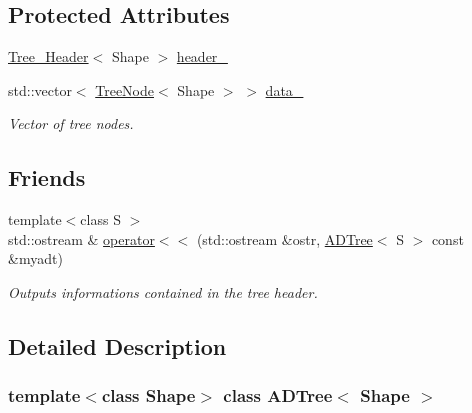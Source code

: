 \subsection*{Protected Attributes}
\begin{DoxyCompactItemize}
\item 
\hyperlink{classTree__Header}{Tree\_\-Header}$<$ Shape $>$ \hyperlink{classADTree_ab5ed42c46d811ca39c9a6966b974a04b}{header\_\-}
\item 
\hypertarget{classADTree_a8d9d14d549f0d88231fa7a4978186b44}{
std::vector$<$ \hyperlink{classTreeNode}{TreeNode}$<$ Shape $>$ $>$ \hyperlink{classADTree_a8d9d14d549f0d88231fa7a4978186b44}{data\_\-}}
\label{classADTree_a8d9d14d549f0d88231fa7a4978186b44}

\begin{DoxyCompactList}\small\item\em Vector of tree nodes. \item\end{DoxyCompactList}\end{DoxyCompactItemize}
\subsection*{Friends}
\begin{DoxyCompactItemize}
\item 
\hypertarget{classADTree_a0386e0202ce113c45fc291d6438ce0de}{
{\footnotesize template$<$class S $>$ }\\std::ostream \& \hyperlink{classADTree_a0386e0202ce113c45fc291d6438ce0de}{operator$<$$<$} (std::ostream \&ostr, \hyperlink{classADTree}{ADTree}$<$ S $>$ const \&myadt)}
\label{classADTree_a0386e0202ce113c45fc291d6438ce0de}

\begin{DoxyCompactList}\small\item\em Outputs informations contained in the tree header. \item\end{DoxyCompactList}\end{DoxyCompactItemize}


\subsection{Detailed Description}
\subsubsection*{template$<$class Shape$>$ class ADTree$<$ Shape $>$}

